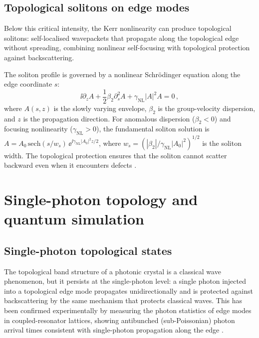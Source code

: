 \subsection{Topological solitons on edge modes}
\label{sec:ch18-soliton}

Below this critical intensity, the Kerr nonlinearity can produce
topological solitons: self-localised wavepackets that propagate along
the topological edge without spreading, combining nonlinear
self-focusing with topological protection against backscattering.

The soliton profile is governed by a nonlinear Schrödinger equation
along the edge coordinate $s$:
\begin{equation}\label{eq:ch18-nls}
  \ii\partial_z A + \frac{1}{2}\beta_2\partial_s^2 A
  + \gamma_{\mathrm{NL}}|A|^2 A = 0\,,
\end{equation}
where $A(s,z)$ is the slowly varying envelope, $\beta_2$ is the
group-velocity dispersion, and $z$ is the propagation direction.
For anomalous dispersion ($\beta_2<0$) and focusing nonlinearity
($\gamma_{\mathrm{NL}}>0$), the fundamental soliton solution is
$A=A_0\,\mathrm{sech}(s/w_s)\,\ee^{\ii\gamma_{\mathrm{NL}}|A_0|^2 z/2}$,
where $w_s=(|\beta_2|/\gamma_{\mathrm{NL}}|A_0|^2)^{1/2}$ is the
soliton width.  The topological protection ensures that the soliton
cannot scatter backward even when it encounters defects
\cite{price2022roadmap}.

\section{Single-photon topology and quantum simulation}

\subsection{Single-photon topological states}
\label{sec:ch18-single-photon-states}

The topological band structure of a photonic crystal is a classical
wave phenomenon, but it persists at the single-photon level: a single
photon injected into a topological edge mode propagates unidirectionally
and is protected against backscattering by the same mechanism that
protects classical waves.  This has been confirmed experimentally by
measuring the photon statistics of edge modes in coupled-resonator
lattices, showing antibunched (sub-Poissonian) photon arrival times
consistent with single-photon propagation along the edge
\cite{ozawa2018topological}.

